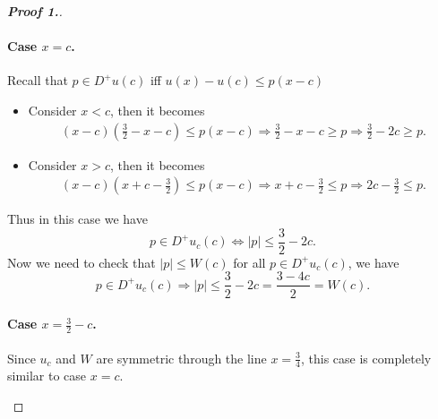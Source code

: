 \documentclass[12pt, oneside]{amsart}  	%
\begin{document}
\begin{proof}[\textbf{Proof 1.}]
\begin{itemize}
\paragraph{\textbf{Case $x = c$.}} Recall that $p\in D^+u(c)$ iff $u(x) - u(c) \leq p(x-c)$
\begin{itemize}
\item Consider $x<c$, then it becomes
\begin{align*}
(x-c)\left(\frac{3}{2}-x-c\right) \leq p(x-c) \Longrightarrow \frac{3}{2}-x-c \geq p \Longrightarrow \frac{3}{2} - 2c\geq p.
\end{align*}
\item Consider $x>c$, then it becomes
\begin{align*}
(x-c)\left(x+c -\frac{3}{2}\right) \leq p(x-c) \Longrightarrow x+c -\frac{3}{2}\leq p \Longrightarrow 2c - \frac{3}{2}\leq p.
\end{align*}
\end{itemize}
Thus in this case we have
\begin{equation*}
p\in D^+u_c(c) \Longleftrightarrow |p|\leq \frac{3}{2}-2c.
\end{equation*}
Now we need to check that $|p|\leq W(c)$ for all $p\in D^+u_c(c)$, we have
\begin{equation*}
p\in D^+u_c(c) \Longrightarrow |p|\leq \frac{3}{2}-2c  = \frac{3-4c}{2} = W(c).
\end{equation*}
\vspace*{0.2cm}


\paragraph{\textbf{Case $x = \frac{3}{2}-c$.}}
Since $u_c$ and $W$ are symmetric through the line $x = \frac{3}{4}$, this case is completely similar to case $x= c$.
\end{itemize}
\end{proof}
\end{document}
